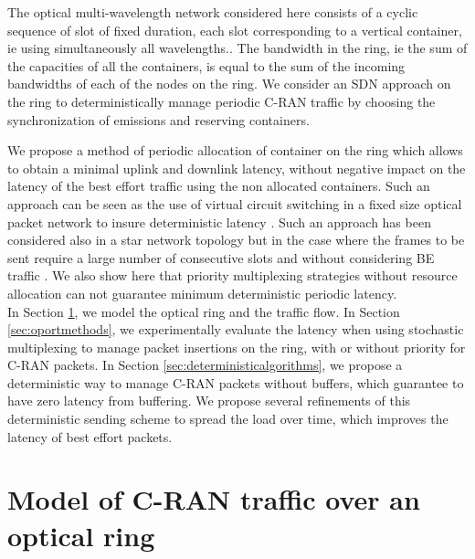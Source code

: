 \documentclass[10pt, conference, letterpaper]{IEEEtran}
\begin{document}
The optical multi-wavelength network considered here consists of a cyclic sequence of slot of fixed duration, each slot corresponding to a vertical container, ie using simultaneously all wavelengths..
The bandwidth in the ring, ie the sum of the capacities of all the containers, is equal to the sum of the incoming bandwidths of each of the nodes on the ring. We consider  an SDN approach on the ring to deterministically manage periodic C-RAN traffic by choosing the synchronization of emissions and reserving containers.

We propose a method of periodic allocation of container on the ring which allows to obtain a minimal uplink and downlink latency, without negative impact on the latency of the  best effort traffic using the non allocated containers. Such an approach can be seen as  the use of virtual circuit switching in a fixed size optical packet network to insure deterministic latency \cite{Sz16}. Such an approach has been considered also in a star network topology but in the case where the frames to be sent require a large number of consecutive slots and without considering BE traffic \cite{dominique2018deterministic}. We also show here that priority multiplexing strategies without resource allocation can not guarantee minimum deterministic periodic latency.\\


In Section \ref{sec:model}, we model the optical ring and the traffic flow. In Section \ref{sec:oportmethods}, we experimentally evaluate the latency when using stochastic multiplexing to manage packet insertions on the ring, with or without priority for C-RAN packets. In Section \ref{sec:deterministicalgorithms}, we propose a deterministic way to manage C-RAN packets without buffers, which guarantee to have zero latency from buffering. We propose several refinements of this deterministic sending scheme to spread the load over time, which improves the latency of best effort packets.

\section{Model of C-RAN traffic over an optical ring}
\label{sec:model}
\end{document}
